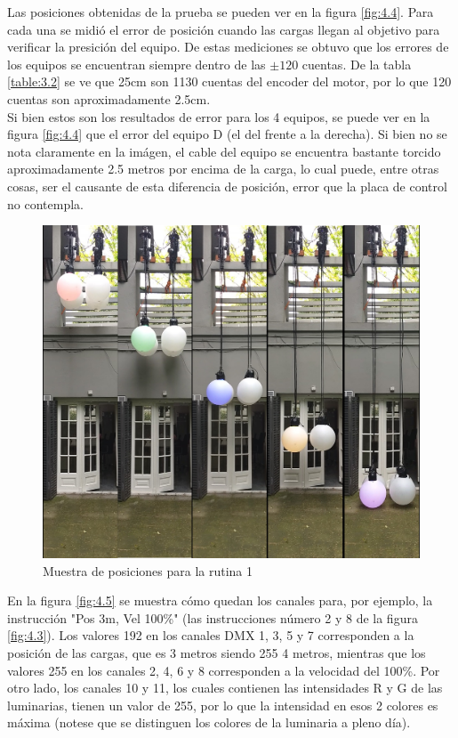 Las posiciones obtenidas de la prueba se pueden ver en la figura \ref{fig:4.4}. Para cada una se midió el error de posición cuando las cargas llegan al objetivo para verificar la presición del equipo. De estas mediciones se obtuvo que los errores de los equipos se encuentran siempre dentro de las \( \pm 120 \) cuentas. De la tabla \ref{table:3.2} se ve que 25cm son 1130 cuentas del encoder del motor, por lo que 120 cuentas son aproximadamente 2.5cm.\\
Si bien estos son los resultados de error para los 4 equipos, se puede ver en la figura \ref{fig:4.4} que el error del equipo D (el del frente a la derecha). Si bien no se nota claramente en la imágen, el cable del equipo se encuentra bastante torcido aproximadamente 2.5 metros por encima de la carga, lo cual puede, entre otras cosas, ser el causante de esta diferencia de posición, error que la placa de control no contempla.

\begin{figure}[!ht]
	\centering
	\includegraphics[width=16cm,scale=1]{resources/4_4-cuelist1_resultados.jpg}
	\caption{Muestra de posiciones para la rutina 1}
	\label{fig:\thefigure}
\end{figure}

En la figura \ref{fig:4.5} se muestra cómo quedan los canales para, por ejemplo, la instrucción "Pos 3m, Vel 100\%" (las instrucciones número 2 y 8 de la figura \ref{fig:4.3}). Los valores 192 en los canales DMX 1, 3, 5 y 7 corresponden a la posición de las cargas, que es 3 metros siendo 255 4 metros, mientras que los valores 255 en los canales 2, 4, 6 y 8 corresponden a la velocidad del 100\%. Por otro lado, los canales 10 y 11, los cuales contienen las intensidades R y G de las luminarias, tienen un valor de 255, por lo que la intensidad en esos 2 colores es máxima (notese que se distinguen los colores de la luminaria a pleno día).

